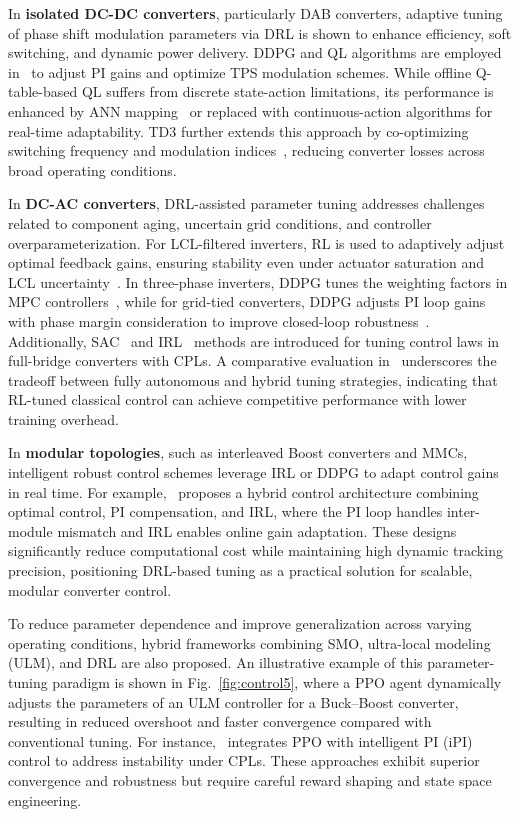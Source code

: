 In \textbf{isolated DC-DC converters}, particularly DAB converters, adaptive tuning of phase shift modulation parameters via DRL is shown to enhance efficiency, soft switching, and dynamic power delivery. DDPG and QL algorithms are employed in~\cite{mahazabeen2022performance, tang2020reinforcement, tang2021deep} to adjust PI gains and optimize TPS modulation schemes. While offline Q-table-based QL suffers from discrete state-action limitations, its performance is enhanced by ANN mapping~\cite{tang2021deep} or replaced with continuous-action algorithms for real-time adaptability. TD3 further extends this approach by co-optimizing switching frequency and modulation indices~\cite{tang2022deep}, reducing converter losses across broad operating conditions.

In \textbf{DC-AC converters}, DRL-assisted parameter tuning addresses challenges related to component aging, uncertain grid conditions, and controller overparameterization. For LCL-filtered inverters, RL is used to adaptively adjust optimal feedback gains, ensuring stability even under actuator saturation and LCL uncertainty~\cite{dragoun2019adaptive}. In three-phase inverters, DDPG tunes the weighting factors in MPC controllers~\cite{he2021weighting,wan2021reinforcement}, while for grid-tied converters, DDPG adjusts PI loop gains with phase margin consideration to improve closed-loop robustness~\cite{jiang2023stability,liang2022multiagent}. Additionally, SAC~\cite{fathollahi2023robust} and IRL~\cite{qie2023new} methods are introduced for tuning control laws in full-bridge converters with CPLs. A comparative evaluation in~\cite{bo2022controller} underscores the tradeoff between fully autonomous and hybrid tuning strategies, indicating that RL-tuned classical control can achieve competitive performance with lower training overhead.

In \textbf{modular topologies}, such as interleaved Boost converters and MMCs, intelligent robust control schemes leverage IRL or DDPG to adapt control gains in real time. For example,~\cite{qie2022new} proposes a hybrid control architecture combining optimal control, PI compensation, and IRL, where the PI loop handles inter-module mismatch and IRL enables online gain adaptation. These designs significantly reduce computational cost while maintaining high dynamic tracking precision, positioning DRL-based tuning as a practical solution for scalable, modular converter control. 

To reduce parameter dependence and improve generalization across varying operating conditions, hybrid frameworks combining SMO, ultra-local modeling (ULM), and DRL are also proposed. An illustrative example of this parameter-tuning paradigm is shown in Fig.~\ref{fig:control5}, where a PPO agent dynamically adjusts the parameters of an ULM controller for a Buck--Boost converter, 
resulting in reduced overshoot and faster convergence compared with conventional tuning. For instance,~\cite{hajihosseini2020dc} integrates PPO with intelligent PI (iPI) control to address instability under CPLs. These approaches exhibit superior convergence and robustness but require careful reward shaping and state space engineering. 

